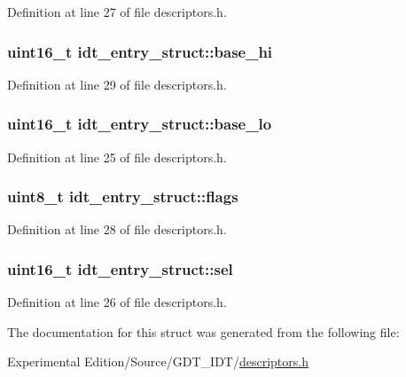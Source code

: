 Definition at line 27 of file descriptors.\+h.

\subsubsection[{\texorpdfstring{base\+\_\+hi}{base_hi}}]{\setlength{\rightskip}{0pt plus 5cm}uint16\+\_\+t idt\+\_\+entry\+\_\+struct\+::base\+\_\+hi}\hypertarget{structidt__entry__struct_af46adb2603d1d8b4a3bedf7f1c6daed4}{}\label{structidt__entry__struct_af46adb2603d1d8b4a3bedf7f1c6daed4}


Definition at line 29 of file descriptors.\+h.

\subsubsection[{\texorpdfstring{base\+\_\+lo}{base_lo}}]{\setlength{\rightskip}{0pt plus 5cm}uint16\+\_\+t idt\+\_\+entry\+\_\+struct\+::base\+\_\+lo}\hypertarget{structidt__entry__struct_a4b5fce0881deb4959d33da77d1ed0202}{}\label{structidt__entry__struct_a4b5fce0881deb4959d33da77d1ed0202}


Definition at line 25 of file descriptors.\+h.

\subsubsection[{\texorpdfstring{flags}{flags}}]{\setlength{\rightskip}{0pt plus 5cm}uint8\+\_\+t idt\+\_\+entry\+\_\+struct\+::flags}\hypertarget{structidt__entry__struct_a02277c77564820972ae5df0a37c80be0}{}\label{structidt__entry__struct_a02277c77564820972ae5df0a37c80be0}


Definition at line 28 of file descriptors.\+h.

\subsubsection[{\texorpdfstring{sel}{sel}}]{\setlength{\rightskip}{0pt plus 5cm}uint16\+\_\+t idt\+\_\+entry\+\_\+struct\+::sel}\hypertarget{structidt__entry__struct_a3c9321c263139e56901a05efee220047}{}\label{structidt__entry__struct_a3c9321c263139e56901a05efee220047}


Definition at line 26 of file descriptors.\+h.



The documentation for this struct was generated from the following file\+:\begin{DoxyCompactItemize}
\item 
Experimental Edition/\+Source/\+G\+D\+T\+\_\+\+I\+D\+T/\hyperlink{descriptors_8h}{descriptors.\+h}\end{DoxyCompactItemize}
